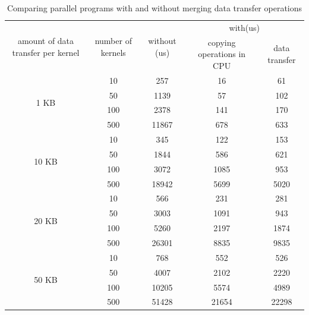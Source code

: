 \documentclass[10pt,conference]{IEEEtran}
\begin{document}
 \renewcommand\arraystretch{1.5}
 \begin{table}[!htb]
  \centering
  \caption{Comparing parallel programs with and without merging data transfer operations}
  \begin{tabular}{|c|c|c|c|c|}
    \hline
    \multirow{2}{*}{amount of data transfer per kernel} &
    \multirow{2}{*}{number of kernels} &
    \multirow{2}{*}{without (us)} &
    \multicolumn{2}{|c|}{with(us)} \\
    \cline{4-5}
   & & & {copying operations in CPU} & {data transfer}\\
    \hline
    \multirow{4}{*}{1 KB}& 10 & 257 & 16 & 61\\
    \cline{2-5}
    & 50 & 1139 & 57 &102\\
     \cline{2-5}
     & 100 & 2378 & 141 &170\\
      \cline{2-5}
      & 500 & 11867 & 678 &633\\
      \hline
       \multirow{4}{*}{10 KB}& 10 & 345 & 122 & 153\\
    \cline{2-5}
    & 50 & 1844 & 586 &621\\
     \cline{2-5}
     & 100 & 3072 & 1085 &953\\
      \cline{2-5}
      & 500 & 18942 & 5699 &5020\\
      \hline
       \multirow{4}{*}{20 KB}& 10 & 566 & 231 & 281\\
    \cline{2-5}
    & 50 & 3003 & 1091 &943\\
     \cline{2-5}
     & 100 & 5260 & 2197 &1874\\
      \cline{2-5}
      & 500 & 26301 & 8835 &9835\\
      \hline
       \multirow{4}{*}{50 KB}& 10 & 768 & 552 & 526\\
    \cline{2-5}
    & 50 & 4007 & 2102 &2220\\
     \cline{2-5}
     & 100 & 10205 & 5574 &4989\\
      \cline{2-5}
      & 500 & 51428 & 21654 &22298\\
      \hline


  \end{tabular}
  \label{tab:pro_pro}
\end{table}
\end{document}
